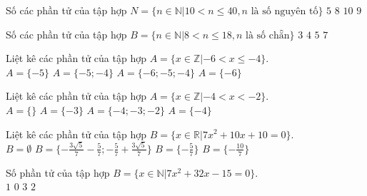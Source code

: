\begin{ex}
 Số các phần tử của tập hợp $N=\{n\in \mathbb{N}| 10< n \le 40, n \text{ là số nguyên tố} \}$ 
\choice
{ ${5}$ }
   { \True ${8}$ }
     { ${10}$ }
    { ${9}$ }
\end{ex}

\begin{ex}
 Số các phần tử của tập hợp $B=\{n\in \mathbb{N}| 8< n \le 18, n \text{ là số chẵn} \}$ 
\choice
{ ${3}$ }
   { ${4}$ }
     { \True ${5}$ }
    { ${7}$ }
\end{ex}

\begin{ex}
 Liệt kê các phần tử của tập hợp $A=\{x\in \mathbb{Z}|-6 < x \le -4 \}$. \\ 
\choice
{ $A=\{-5\}$ }
   { \True $A=\{-5; -4\}$ }
     { $A=\{-6; -5; -4\}$ }
    { $A=\{-6\}$ }
\loigiai{ 
  
 }\end{ex}

\begin{ex}
 Liệt kê các phần tử của tập hợp $A=\{x\in \mathbb{Z}|-4 < x < -2 \}$. \\ 
\choice
{ $A=\{\}$ }
   { \True $A=\{-3\}$ }
     { $A=\{-4; -3; -2\}$ }
    { $A=\{-4\}$ }
\loigiai{ 
  
 }\end{ex}

\begin{ex}
 Liệt kê các phần tử của tập hợp $B=\{x\in \mathbb{R}|7 x^{2} + 10 x + 10=0 \}$.\\ 
\choice
{ \True $B=\emptyset$ }
   { $B=\{- \frac{3 \sqrt{5}}{7} - \frac{5}{7}; - \frac{5}{7} + \frac{3 \sqrt{5}}{7}\}$ }
     { $B=\{- \frac{5}{7}\}$ }
    { $B=\{- \frac{10}{7}\}$ }
\end{ex}

\begin{ex}
 Số phần tử của tập hợp $B=\{x\in \mathbb{N}|7 x^{2} + 32 x - 15=0 \}$.\\ 
\choice
{ ${1}$ }
   { \True ${0}$ }
     { ${3}$ }
    { ${2}$ }
\end{ex}

